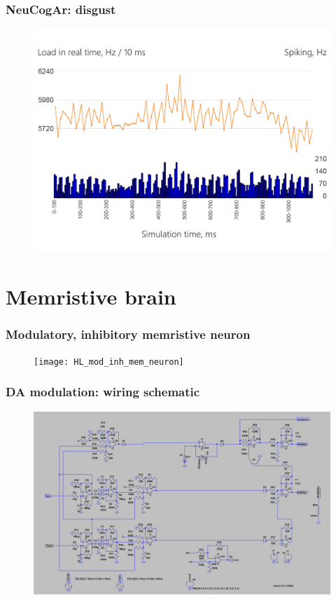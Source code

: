 \documentclass[12pt, aspectratio=169]{beamer}
\begin{document}
\begin{frame}
  \frametitle{NeuCogAr: disgust}
  \begin{figure}
    \includegraphics[width=0.7\linewidth]{5ht_results}
  \end{figure}
\end{frame}



\section{Memristive brain}

\begin{frame}
  \frametitle{Modulatory, inhibitory memristive neuron}
  \begin{figure}
    \texttt{[image: HL\_mod\_inh\_mem\_neuron]}
  \end{figure}
\end{frame}


\begin{frame}
\frametitle{DA modulation: wiring schematic}
\begin{figure}
\includegraphics[width=0.85\linewidth]{da_modulation_sch}
\end{figure}
\end{frame}
\end{document}

